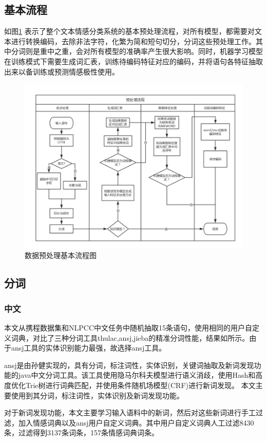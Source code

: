 \subsection{基本流程}
如图\ref{fig:preprocessing} 表示了整个文本情感分类系统的基本预处理流程，对所有模型，都需要对文本进行转换编码，去除非法字符，化繁为简和短句切分，分词这些预处理工作。其中分词则是重中之重，会对所有模型的准确率产生很大影响。同时，机器学习模型在训练模式下需要生成词汇表，训练待编码特征对应的编码，并将语句各特征抽取出来以备训练或预测情感极性使用。

\begin{figure}[!htbp]
\begin{center}
\includegraphics[width=\textwidth]{graphic/prepocessing.png}
\caption{数据预处理基本流程图 \label{fig:preprocessing}}
\end{center}
\end{figure}

\subsection{分词}
\subsubsection{中文}
本文从携程数据集和NLPCC中文任务中随机抽取15条语句，使用相同的用户自定义词典，对比了三种分词工具thulac,ansj,jieba的精准分词性能，结果如所示。由于ansj工具的实体识别能力最强，故选择ansj工具。\par
ansj是由孙健实现的，具有分词，标注词性，实体识别，关键词抽取及新词发现功能的java中文分词工具。该工具使用隐马尔科夫模型进行语义消歧，使用Hash和高度优化Trie树进行词典匹配，并使用条件随机场模型(CRF)进行新词发现。\cite{ansjwiki} 本文主要使用到其分词，标注词性，实体识别及新词发现功能。\par
对于新词发现功能，本文主要学习输入语料中的新词，然后对这些新词进行手工过滤，加入情感词典以及ansj用户自定义词典。其中用户自定义词典人工过滤8430条，过滤得到3137条词条，157条情感词典词条。
